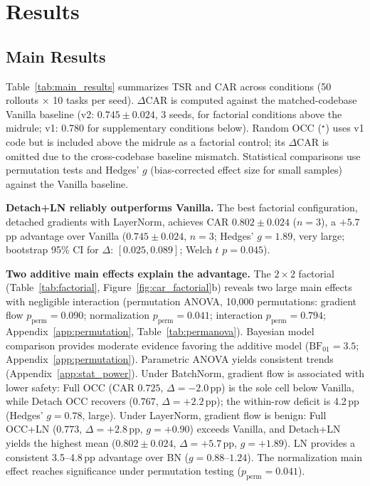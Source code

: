 
\section{Results}
\label{sec:results}

\subsection{Main Results}

Table~\ref{tab:main_results} summarizes TSR and CAR across conditions (50 rollouts $\times$ 10 tasks per seed). $\Delta$CAR is computed against the matched-codebase Vanilla baseline (v2: $0.745 \pm 0.024$, 3 seeds, for factorial conditions above the midrule; v1: 0.780 for supplementary conditions below). Random OCC ($^\star$) uses v1 code but is included above the midrule as a factorial control; its $\Delta$CAR is omitted due to the cross-codebase baseline mismatch. Statistical comparisons use permutation tests and Hedges' $g$ (bias-corrected effect size for small samples) against the Vanilla baseline.

\textbf{Detach+LN reliably outperforms Vanilla.} The best factorial configuration, detached gradients with LayerNorm, achieves CAR $0.802 \pm 0.024$ ($n{=}3$), a $+5.7$\,pp advantage over Vanilla ($0.745 \pm 0.024$, $n{=}3$; Hedges' $g{=}1.89$, very large; bootstrap 95\% CI for $\Delta$: $[0.025, 0.089]$; Welch $t$ $p{=}0.045$).

\textbf{Two additive main effects explain the advantage.} The $2{\times}2$ factorial (Table~\ref{tab:factorial}, Figure~\ref{fig:car_factorial}b) reveals two large main effects with negligible interaction (permutation ANOVA, 10{,}000 permutations: gradient flow $p_\text{perm}{=}0.090$; normalization $p_\text{perm}{=}0.041$; interaction $p_\text{perm}{=}0.794$; Appendix~\ref{app:permutation}, Table~\ref{tab:permanova}). Bayesian model comparison provides moderate evidence favoring the additive model ($\text{BF}_{01}{=}3.5$; Appendix~\ref{app:permutation}). Parametric ANOVA yields consistent trends (Appendix~\ref{app:stat_power}). Under BatchNorm, gradient flow is associated with lower safety: Full OCC (CAR $0.725$, $\Delta{=}-2.0$\,pp) is the sole cell below Vanilla, while Detach OCC recovers ($0.767$, $\Delta{=}+2.2$\,pp); the within-row deficit is 4.2\,pp (Hedges' $g{=}0.78$, large). Under LayerNorm, gradient flow is benign: Full OCC+LN ($0.773$, $\Delta{=}+2.8$\,pp, $g{=}+0.90$) exceeds Vanilla, and Detach+LN yields the highest mean ($0.802 \pm 0.024$, $\Delta{=}+5.7$\,pp, $g{=}+1.89$). LN provides a consistent 3.5--4.8\,pp advantage over BN ($g{=}0.88$--$1.24$). The normalization main effect reaches significance under permutation testing ($p_\text{perm}{=}0.041$).

